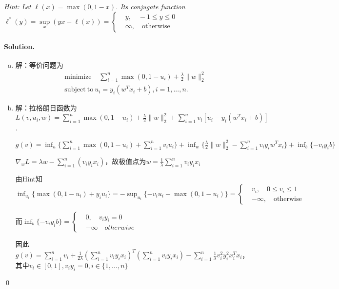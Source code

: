 \documentclass[a4paper]{article}
\newenvironment{solution}
{\color{blue} \paragraph{Solution.}}
{\newline \qed}
\begin{document}
\noindent\emph{Hint: Let $\ell(x)=\max(0,1-x)$. Its conjugate function $\ell^\ast(y)=\sup\limits_{x}(yx-\ell(x))=\left\{
\begin{aligned}
&y, \quad-1\leq y\leq0 \\
&\infty,\quad\text{otherwise}
\end{aligned}
\right.$}
\begin{solution}
    \begin{enumerate}[a)]
        \item 解：等价问题为
            \begin{equation*}
                \begin{split}
                    &\text{minimize~~}\ \ \sum_{i=1}^n\max(0, 1-u_i)+\frac{\lambda}2\|w\|_2^2\\
                    &\text{subject}\ \text{to}\ u_i=y_i(w^Tx_i+b), i=1, ...,n.
                \end{split}
            \end{equation*}

        \item 解：拉格朗日函数为$L(v, u_i, w)=\sum_{i=1}^n\max(0, 1-u_i)+\frac \lambda 2\|w\|_2^2 + \sum_{i=1}^n v_i[u_i-y_i(w^Tx_i + b)]$.
        
                $g(v)=\inf_{u}\{\sum_{i=1}^n\max(0, 1-u_i)+\sum_{i=1}^n v_iu_i\}+\inf_w\{\frac \lambda 2 \|w\|_2^2-\sum_{i=1}^nv_iy_iw^Tx_i\}+\inf_b\{-v_iy_ib\}$

                $\nabla_w L=\lambda w-\sum_{i=1}^n(v_iy_ix_i)$，故极值点为$w=\frac 1\lambda\sum_{i=1}^nv_iy_ix_i$

                由Hint知$\inf_{u_i}\{\max(0, 1-u_i)+y_iu_i\}=-\sup_{u_i}\{-v_iu_i-\max(0, 1-u_i)\}=\left\{
                \begin{aligned}
                    &v_i, \quad 0\leq v_i\leq 1 \\
                    &-\infty,\quad\text{otherwise}
                \end{aligned}\right.$

                而$\inf_b\{-v_iy_ib\}=\left\{
                \begin{aligned}
                    &0, \quad v_iy_i=0\\
                    &-\infty \quad otherwise
                \end{aligned}\right.$

                因此$g(v)=\sum_{i=1}^n v_i+\frac 1{2\lambda}(\sum_{i=1}^nv_iy_ix_i)^T(\sum_{i=1}^nv_iy_ix_i)-\sum_{i=1}^n \frac 1\lambda v_i^2y_i^2x_i^Tx_i$，其中$v_i\in[0, 1],v_iy_i=0, i\in\{1, ...,n\}$


\end{enumerate}
\end{solution}
\end{document}
